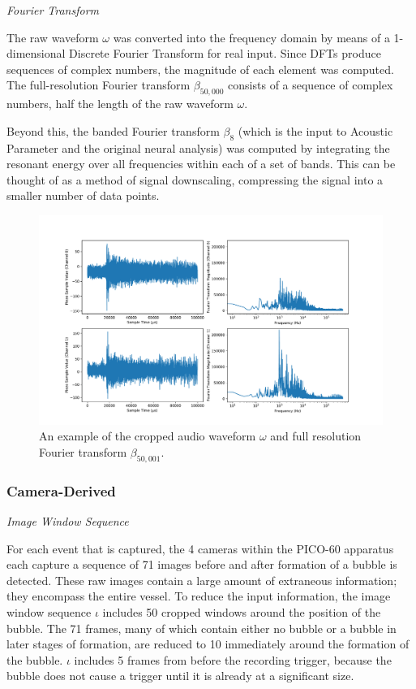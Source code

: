 \documentclass[10pt]{article}
\begin{document}
\textit{Fourier Transform}

The raw waveform $\omega$ was converted into the frequency domain by means of a 1-dimensional Discrete Fourier Transform for real input. Since DFTs produce sequences of complex numbers, the magnitude of each element was computed. The full-resolution Fourier transform $\beta _{50,000}$ consists of a sequence of complex numbers, half the length of the raw waveform $\omega$.

Beyond this, the banded Fourier transform $\beta_{8}$ (which is the input to Acoustic Parameter and the original neural analysis) was computed by integrating the resonant energy over all frequencies within each of a set of bands. This can be thought of as a method of signal downscaling, compressing the signal into a smaller number of data points.

\begin{figure}[h]
    \centering
    \includegraphics[width=\textwidth]{audio}
    \caption{\label{} An example of the cropped audio waveform $\omega$ and full resolution Fourier transform $\beta_{50,001}$.}
\end{figure}

\subsubsection{Camera-Derived}

\textit{Image Window Sequence}

For each event that is captured, the 4 cameras within the PICO-60 apparatus each capture a sequence of 71 images before and after formation of a bubble is detected. These raw images contain a large amount of extraneous information; they encompass the entire vessel. To reduce the input information, the image window sequence $\iota$ includes 50 cropped windows around the position of the bubble. The 71 frames, many of which contain either no bubble or a bubble in later stages of formation, are reduced to 10 immediately around the formation of the bubble. $\iota$ includes 5 frames from before the recording trigger, because the bubble does not cause a trigger until it is already at a significant size.
\end{document}
